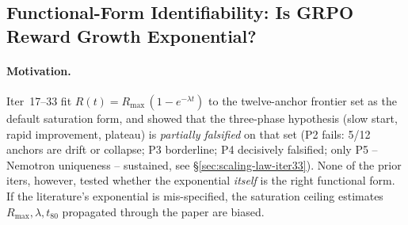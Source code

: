 \subsection{Functional-Form Identifiability: Is GRPO Reward Growth Exponential?}
\label{sec:scaling-law-iter37}

\paragraph{Motivation.}
Iter~17--33 fit $R(t) = R_{\max}\,(1 - e^{-\lambda t})$ to the twelve-anchor
frontier set as the default saturation form, and showed that the
three-phase hypothesis (slow start, rapid improvement, plateau) is
\emph{partially falsified} on that set (P2 fails: 5/12 anchors are drift
or collapse; P3 borderline; P4 decisively falsified; only P5 -- Nemotron
uniqueness -- sustained, see \S\ref{sec:scaling-law-iter33}). None of
the prior iters, however, tested whether the exponential
\emph{itself} is the right functional form. If the literature's
exponential is mis-specified, the saturation ceiling estimates
$R_{\max}, \lambda, t_{80}$ propagated through the paper are biased.

